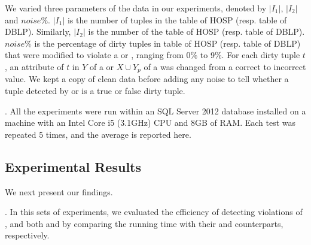 \begin{footnotesize}
\end{footnotesize}


 



We varied three parameters of the data in our experiments, denoted by $|I_1|$, $|I_2|$ and $noise\%$. $|I_1|$ is the number of tuples in the table  of HOSP (resp. table  of DBLP). Similarly, $|I_2|$ is the number of the table  of HOSP (resp. table  of DBLP). $noise\%$ is the percentage of dirty tuples in table  of HOSP (resp. table  of DBLP) that were modified to violate a \pCFD or \pCIND, ranging from 0\% to 9\%. For each dirty tuple $t$, an attribute of $t$ in $Y$ of a \pCFD or $X \cup Y_p$ of a \pCIND was changed from a correct to incorrect value. We kept a copy of clean data before adding any noise to tell whether a tuple detected by \pCFDs or \pCINDs is a true or false dirty tuple.

. All the experiments were run within an SQL Server 2012 database installed on a machine with an Intel Core i5 (3.1GHz) CPU and 8GB of RAM. Each test was repeated 5 times, and the average is reported here.

\subsection{Experimental Results}

We next present our findings.

. In this sets of experiments, we evaluated the efficiency of detecting violations of \pCFDs, \pCINDs and both \pCFDs and \pCINDs by comparing the running time with their \CFDs and \CINDs counterparts, respectively.


